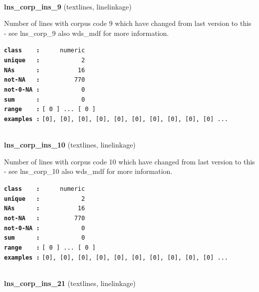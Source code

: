 \documentclass[]{article}
\begin{document}
~

\textbf{lns\_corp\_ins\_9} (textlines, linelinkage)

Number of lines with corpus code 9 which have changed from last version
to this - see lns\_corp\_9 also wds\_mdf for more information.

\textbf{\texttt{class\ \ \ \ :}} \texttt{~~~~~numeric}\\
\textbf{\texttt{unique\ \ \ :}} \texttt{~~~~~~~~~~~2}\\
\textbf{\texttt{NAs\ \ \ \ \ \ :}} \texttt{~~~~~~~~~~16}\\
\textbf{\texttt{not-NA\ \ \ :}} \texttt{~~~~~~~~~770}\\
\textbf{\texttt{not-0-NA\ :}} \texttt{~~~~~~~~~~~0}\\
\textbf{\texttt{sum\ \ \ \ \ \ :}} \texttt{~~~~~~~~~~~0}\\
\textbf{\texttt{range\ \ \ \ :}}
\texttt{{[}\ 0\ {]}\ ...\ {[}\ 0\ {]}}\\
\textbf{\texttt{examples\ :}}
\texttt{{[}0{]},\ {[}0{]},\ {[}0{]},\ {[}0{]},\ {[}0{]},\ {[}0{]},\ {[}0{]},\ {[}0{]},\ {[}0{]},\ {[}0{]}\ ...}\\

~

\textbf{lns\_corp\_ins\_10} (textlines, linelinkage)

Number of lines with corpus code 10 which have changed from last version
to this - see lns\_corp\_10 also wds\_mdf for more information.

\textbf{\texttt{class\ \ \ \ :}} \texttt{~~~~~numeric}\\
\textbf{\texttt{unique\ \ \ :}} \texttt{~~~~~~~~~~~2}\\
\textbf{\texttt{NAs\ \ \ \ \ \ :}} \texttt{~~~~~~~~~~16}\\
\textbf{\texttt{not-NA\ \ \ :}} \texttt{~~~~~~~~~770}\\
\textbf{\texttt{not-0-NA\ :}} \texttt{~~~~~~~~~~~0}\\
\textbf{\texttt{sum\ \ \ \ \ \ :}} \texttt{~~~~~~~~~~~0}\\
\textbf{\texttt{range\ \ \ \ :}}
\texttt{{[}\ 0\ {]}\ ...\ {[}\ 0\ {]}}\\
\textbf{\texttt{examples\ :}}
\texttt{{[}0{]},\ {[}0{]},\ {[}0{]},\ {[}0{]},\ {[}0{]},\ {[}0{]},\ {[}0{]},\ {[}0{]},\ {[}0{]},\ {[}0{]}\ ...}\\

~

\textbf{lns\_corp\_ins\_21} (textlines, linelinkage)
\end{document}
